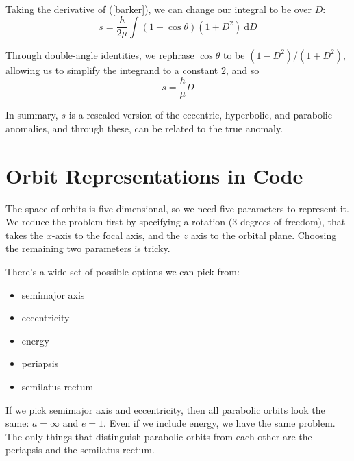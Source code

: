 \documentclass{article}
\newcommand{\dd}{\mathrm{d}}
\numberwithin{equation}{subsection}
\begin{document}
Taking the derivative of (\ref{barker}), we can change our integral to be over $D$:
\begin{equation}
s = \frac{h}{2 \mu} \int (1 + \cos \theta)(1 + D^2)~\dd D
\end{equation}

Through double-angle identities, we rephrase $\cos \theta$ to be $(1 - D^2)/(1 + D^2)$, allowing us to simplify the integrand to a constant $2$, and so
\begin{equation}
\label{parabolic-anomaly}
s = \frac{h}{\mu} D
\end{equation}

In summary, $s$ is a rescaled version of the eccentric, hyperbolic, and parabolic anomalies, and through these, can be related to the true anomaly.



\section{Orbit Representations in Code}

The space of orbits is five-dimensional, so we need five parameters to represent it. We reduce the problem first by specifying a rotation (3 degrees of freedom), that takes the $x$-axis to the focal axis, and the $z$ axis to the orbital plane. Choosing the remaining two parameters is tricky.

There's a wide set of possible options we can pick from:
\begin{itemize}
\item semimajor axis
\item eccentricity
\item energy
\item periapsis
\item semilatus rectum
\end{itemize}

If we pick semimajor axis and eccentricity, then all parabolic orbits look the same: $a = \infty$ and $e = 1$. Even if we include energy, we have the same problem. The only things that distinguish parabolic orbits from each other are the periapsis and the semilatus rectum.
\end{document}
